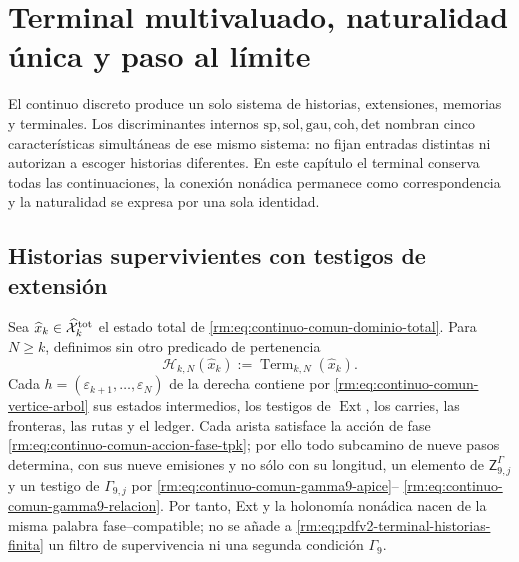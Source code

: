 \chapter[Terminal, naturalidad y l\'imite]{Terminal multivaluado, naturalidad \'unica y paso al l\'imite}
\label{rm:chap:pdfv2-terminal-naturalidad-limite}

\begin{thesisbox}
El continuo discreto produce un solo sistema de historias, extensiones,
memorias y terminales. Los discriminantes internos
\(\mathrm{sp},\mathrm{sol},\mathrm{gau},\mathrm{coh},\mathrm{det}\)
nombran cinco caracter\'isticas simult\'aneas de ese mismo sistema: no fijan
entradas distintas ni autorizan a escoger historias diferentes. En este
cap\'itulo el terminal conserva todas las continuaciones, la conexi\'on
non\'adica permanece como correspondencia y la naturalidad se expresa por una
sola identidad.
\end{thesisbox}

\section{Historias supervivientes con testigos de extensi\'on}

Sea
\(\widehat x_k\in\widehat{\mathcal X}^{\rm tot}_k\) el estado total de
\eqref{rm:eq:continuo-comun-dominio-total}. Para \(N\geq k\), definimos sin
otro predicado de pertenencia
\begin{equation}
\label{rm:eq:pdfv2-terminal-historias-finita}
 \mathscr H_{k,N}(\widehat x_k)
 :=\operatorname{Term}_{k,N}(\widehat x_k).
\end{equation}
Cada
\(h=(\varepsilon_{k+1},\ldots,\varepsilon_N)\) de la derecha contiene por
\eqref{rm:eq:continuo-comun-vertice-arbol} sus estados intermedios, los testigos
de \(\operatorname{Ext}\), los carries, las fronteras, las rutas y el ledger.
Cada arista satisface la acción de fase
\eqref{rm:eq:continuo-comun-accion-fase-tpk}; por ello todo subcamino de nueve
pasos determina, con sus nueve emisiones y no sólo con su longitud, un
elemento de \(\mathsf Z^\Gamma_{9,j}\) y un testigo de
\(\Gamma_{9,j}\) por
\eqref{rm:eq:continuo-comun-gamma9-apice}--
\eqref{rm:eq:continuo-comun-gamma9-relacion}. Por tanto, Ext y la holonomía
non\'adica nacen de la misma palabra fase--compatible; no se añade a
\eqref{rm:eq:pdfv2-terminal-historias-finita} un filtro de supervivencia ni una
segunda condici\'on \(\Gamma_9\).

